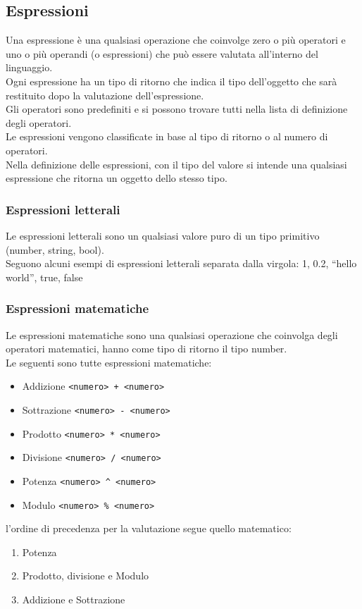 \subsection{Espressioni}
Una espressione è una qualsiasi operazione che coinvolge zero o più operatori e uno o più operandi 
(o espressioni) che può essere valutata all’interno del linguaggio. \\
Ogni espressione ha un tipo di ritorno che indica il tipo dell’oggetto che sarà restituito dopo la valutazione 
dell’espressione. \\
Gli operatori sono predefiniti e si possono trovare tutti nella lista di definizione degli operatori. \\
Le espressioni vengono classificate in base al tipo di ritorno o al numero di operatori. \\
Nella definizione delle espressioni, con il tipo del valore si intende una qualsiasi espressione che ritorna 
un oggetto dello stesso tipo.

\subsubsection{Espressioni letterali}
Le espressioni letterali sono un qualsiasi valore puro di un tipo primitivo (number, string, bool). \\ 
Seguono alcuni esempi di espressioni letterali separata dalla virgola: 1, 0.2, “hello world”, true, false

\subsubsection{Espressioni matematiche}
Le espressioni matematiche sono una qualsiasi operazione che coinvolga degli operatori matematici,
hanno come tipo di ritorno il tipo number.
\\
Le seguenti sono tutte espressioni matematiche:
\begin{itemize}
    \item Addizione \lstinline|<numero> + <numero>|
    \item Sottrazione \lstinline|<numero> - <numero>|
    \item Prodotto \lstinline|<numero> * <numero>|
    \item Divisione \lstinline|<numero> / <numero>|
    \item Potenza \lstinline|<numero> ^ <numero>|
    \item Modulo \lstinline|<numero> % <numero>|
\end{itemize}
l'ordine di precedenza per la valutazione segue quello matematico:
\begin{enumerate}
    \item Potenza
    \item Prodotto, divisione e Modulo
    \item Addizione e Sottrazione
\end{enumerate}

